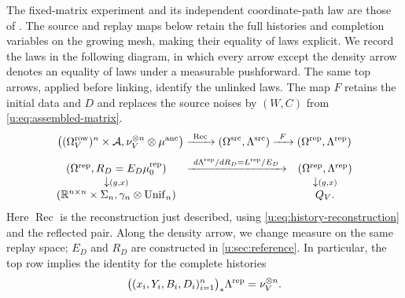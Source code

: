 The fixed-matrix experiment and its independent coordinate-path law are
those of \cite[Section~4.1]{oai-typical-upper}. The source and replay
maps below retain the full histories and completion variables on the
growing mesh, making their equality of laws explicit.
We record the laws in the following diagram, in which every arrow except the
density arrow denotes an equality of laws under a measurable pushforward. The same
top arrows, applied before linking, identify the unlinked laws. The map $F$
retains the initial data and $D$ and replaces the source noises by
$(W,C)$ from \eqref{u:eq:assembled-matrix}.
\begin{equation}\label{u:eq:law-diagram}
 \begin{gathered}
 \bigl((\Omega^{\rm row}_V)^n\times\mathcal A,
       \nu_V^{\otimes n}\otimes\mu^{\rm anc}\bigr)
 \xrightarrow{\ \operatorname{Rec}\ }
       (\Omega^{\rm src},\Lambda^{\rm src})
 \xrightarrow{\ F\ }
       (\Omega^{\rm rep},\Lambda^{\rm rep})
 \\[4pt]
 \begin{array}{ccc}
 (\Omega^{\rm rep},R_D=E_D\mu^{\rm rep}_0)
 &\xrightarrow{\ d\Lambda^{\rm rep}/dR_D=L^{\rm rep}/E_D\ }&
 (\Omega^{\rm rep},\Lambda^{\rm rep})\\
 \downarrow\scriptstyle(g,x)&&\downarrow\scriptstyle(g,x)\\
 (\mathbb R^{n\times n}\times\Sigma_n,\gamma_n\otimes\operatorname{Unif}_n)&&Q_V.
 \end{array}
 \end{gathered}
\end{equation}
Here $\operatorname{Rec}$ is the reconstruction just described,
using \eqref{u:eq:history-reconstruction} and the reflected pair.
Along the density arrow, we change measure on the same replay space; $E_D$
and $R_D$ are constructed in \cref{u:sec:reference}. In particular,
the top row implies the identity for the complete histories
\begin{equation}\label{u:eq:row-history}
 \bigl((x_i,Y_i,B_i,D_i)_{i=1}^n\bigr)_*\Lambda^{\rm rep}
       =\nu_V^{\otimes n}.
\end{equation}


